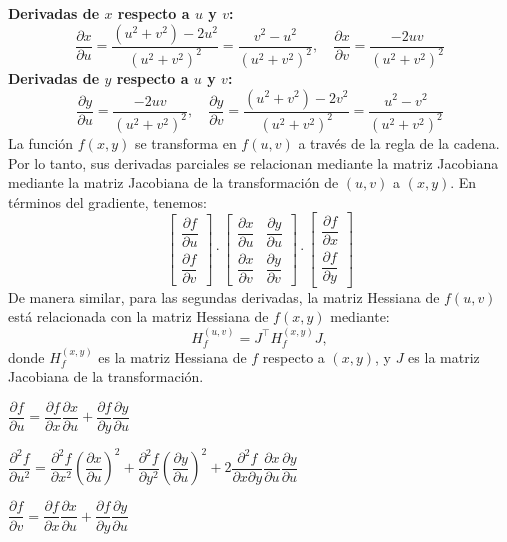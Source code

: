 \begin{enumerate}[label=\color{red}\textbf{\arabic*)}, leftmargin=*]
\textbf{Derivadas de $x$ respecto a $u$ y $v$:}
$$
\dfrac{ \partial x }{ \partial u } =\dfrac{(u^{2}+v^{2})-2u^{2}}{(u^{2}+v^{2})^{2}}=\dfrac{v^{2}-u^{2}}{(u^{2}+v^{2})^{2}},\quad \dfrac{\partial x}{\partial v}=\dfrac{-2uv}{(u^{2}+v^{2})^{2}}
$$
\textbf{Derivadas de $y$ respecto a $u$ y $v$:}
$$
\dfrac{ \partial y }{ \partial u } =\dfrac{-2uv}{(u^{2}+v^{2})^{2}},\quad\dfrac{ \partial y }{ \partial v } =\dfrac{(u^{2}+v^{2})-2v^{2}}{(u^{2}+v^{2})^{2}}=\dfrac{u^{2}-v^{2}}{(u^{2}+v^{2})^{2}}
$$
La función $f(x,y)$ se transforma en $f(u,v)$ a través de la regla de la cadena. Por lo tanto, sus derivadas parciales se relacionan mediante la matriz Jacobiana mediante la matriz Jacobiana de la transformación de $(u,v)$ a $(x,y)$. En términos del gradiente, tenemos:
$$
\begin{bmatrix}
\dfrac{ \partial f }{ \partial u }  \\
\dfrac{ \partial f }{ \partial v } 
\end{bmatrix}\cdot \begin{bmatrix}
\dfrac{ \partial x }{ \partial u }  & \dfrac{ \partial y }{ \partial u }  \\
\dfrac{ \partial x }{ \partial v }  & \dfrac{ \partial y }{ \partial v } 
\end{bmatrix}\cdot \begin{bmatrix}
\dfrac{ \partial f }{ \partial x }  \\
\dfrac{ \partial f }{ \partial y } 
\end{bmatrix}
$$
De manera similar, para las segundas derivadas, la matriz Hessiana de $f(u,v)$ está relacionada con la matriz Hessiana de $f(x,y)$ mediante: 
$$
H_{f}^{(u,v)}=J^{\intercal}H_{f}^{(x,y)}J,
$$
donde $H_{f}^{(x,y)}$ es la matriz Hessiana de $f$ respecto a $(x,y)$, y $J$ es la matriz Jacobiana de la transformación.

$\dfrac{ \partial f }{ \partial u }=\dfrac{ \partial f }{ \partial x }\dfrac{ \partial x }{ \partial u }+\dfrac{ \partial f }{ \partial y }\dfrac{ \partial y }{ \partial u }$

$\dfrac{ \partial^{2} f }{ \partial u^{2} }=\dfrac{ \partial^{2} f }{ \partial x^{2} }\left( \dfrac{ \partial x }{ \partial u } \right)^{2}+\dfrac{ \partial^{2} f }{ \partial y^{2} }\left( \dfrac{ \partial y }{ \partial u } \right)^{2}+2\dfrac{ \partial^{2} f }{ \partial x\partial y }\dfrac{ \partial x }{ \partial u }\dfrac{ \partial y }{ \partial u }$ 

$\dfrac{ \partial f }{ \partial v }=\dfrac{ \partial f }{ \partial x }\dfrac{ \partial x }{ \partial u }+\dfrac{ \partial f }{ \partial y }\dfrac{ \partial y }{ \partial u }$


\end{enumerate}
